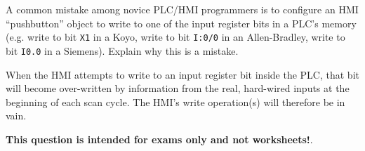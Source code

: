 

A common mistake among novice PLC/HMI programmers is to configure an HMI ``pushbutton'' object to write to one of the input register bits in a PLC's memory (e.g. write to bit {\tt X1} in a Koyo, write to bit {\tt I:0/0} in an Allen-Bradley, write to bit {\tt I0.0} in a Siemens).  Explain why this is a mistake.







When the HMI attempts to write to an input register bit inside the PLC, that bit will become over-written by information from the real, hard-wired inputs at the beginning of each scan cycle.  The HMI's write operation(s) will therefore be in vain.







{\bf This question is intended for exams only and not worksheets!}.


